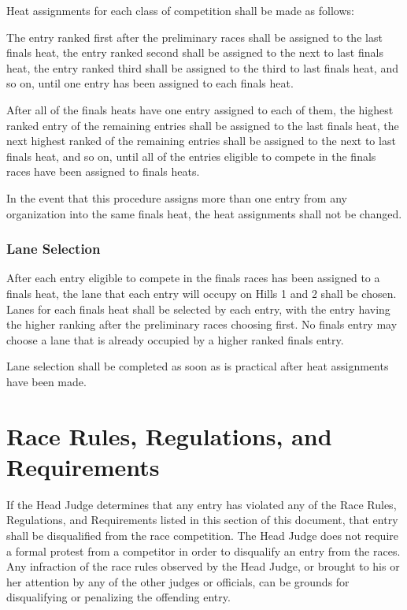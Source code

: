 \documentclass[openany]{book}
\begin{document}
Heat assignments for each class of competition shall be made as follows:

The entry ranked first after the preliminary races shall be assigned to the last finals heat, the entry ranked second shall be assigned to the next to last finals heat, the entry ranked third shall be assigned to the third to last finals heat, and so on, until one entry has been assigned to each finals heat.

After all of the finals heats have one entry assigned to each of them, the highest ranked entry of the remaining entries shall be assigned to the last finals heat, the next highest ranked of the remaining entries shall be assigned to the next to last finals heat, and so on, until all of the entries eligible to compete in the finals races have been assigned to finals heats.

In the event that this procedure assigns more than one entry from any organization into the same finals heat, the heat assignments shall not be changed.

\subsubsection{Lane Selection}

After each entry eligible to compete in the finals races has been assigned to a finals heat, the lane that each entry will occupy on Hills 1 and 2 shall be chosen. Lanes for each finals heat shall be selected by each entry, with the entry having the higher ranking after the preliminary races choosing first. No finals entry may choose a lane that is already occupied by a higher ranked finals entry.

Lane selection shall be completed as soon as is practical after heat assignments have been made.

\section{Race Rules, Regulations, and Requirements}

If the Head Judge determines that any entry has violated any of the Race Rules, Regulations, and Requirements listed in this section of this document, that entry shall be disqualified from the race competition. The Head Judge does not require a formal protest from a competitor in order to disqualify an entry from the races. Any infraction of the race rules observed by the Head Judge, or brought to his or her attention by any of the other judges or officials, can be grounds for disqualifying or penalizing the offending entry.
\end{document}
